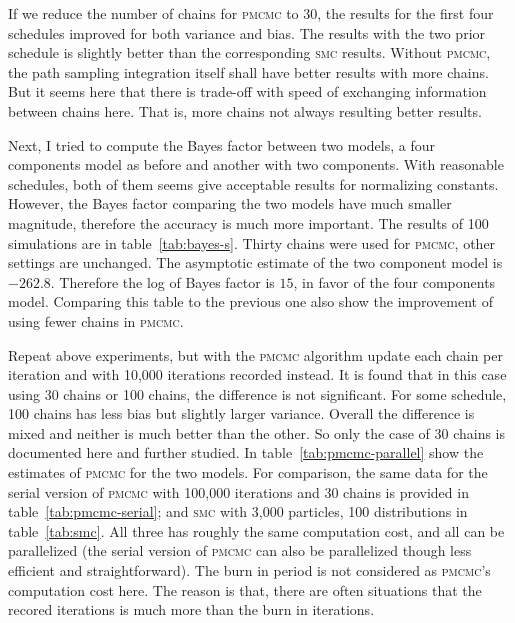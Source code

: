 \documentclass[11pt, bib, fontset = Minion]{marticle}
\def\pmcmc{\textsc{pmcmc}\xspace}
\def\smc{\textsc{smc}\xspace}
\begin{document}
  If we reduce the number of chains for \pmcmc to 30, the results for the
  first four schedules improved for both variance and bias. The results with
  the two prior schedule is slightly better than the corresponding \smc
  results. Without \pmcmc, the path sampling integration itself shall have
  better results with more chains. But it seems here that there is trade-off
  with speed of exchanging information between chains here. That is, more
  chains not always resulting better results.

  Next, I tried to compute the Bayes factor between two models, a four
  components model as before and another with two components. With reasonable
  schedules, both of them seems give acceptable results for normalizing
  constants. However, the Bayes factor comparing the two models have much
  smaller magnitude, therefore the accuracy is much more important. The
  results of 100 simulations are in table~\ref{tab:bayes-s}. Thirty chains were
  used for \pmcmc, other settings are unchanged. The asymptotic estimate of
  the two component model is $-262.8$. Therefore the log of Bayes factor is
  $15$, in favor of the four components model. Comparing this table to the
  previous one also show the improvement of using fewer chains in \pmcmc.

  Repeat above experiments, but with the \pmcmc algorithm update each chain
  per iteration and with 10,000 iterations recorded instead. It is found that
  in this case using 30 chains or 100 chains, the difference is not
  significant. For some schedule, 100 chains has less bias but slightly larger
  variance. Overall the difference is mixed and neither is much better than
  the other. So only the case of 30 chains is documented here and further
  studied. In table~\ref{tab:pmcmc-parallel} show the estimates of \pmcmc for
  the two models. For comparison, the same data for the serial version of
  \pmcmc with 100,000 iterations and 30 chains is provided in
  table~\ref{tab:pmcmc-serial}; and \smc with 3,000 particles, 100
  distributions in table~\ref{tab:smc}. All three has roughly the same
  computation cost, and all can be parallelized (the serial version of \pmcmc
  can also be parallelized though less efficient and straightforward). The
  burn in period is not considered as \pmcmc's computation cost here. The
  reason is that, there are often situations that the recored iterations is
  much more than the burn in iterations.
\end{document}
